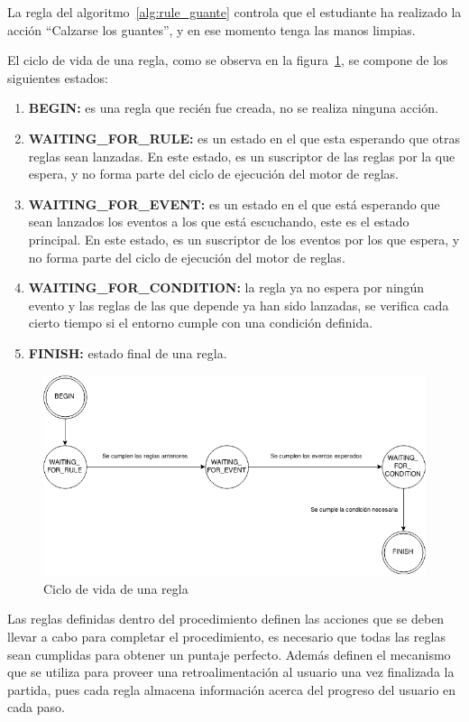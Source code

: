 La regla del algoritmo~\ref{alg:rule_guante} controla que el estudiante ha
realizado la acción \enquote{Calzarse los guantes}, y en ese momento tenga las 
manos limpias.

El ciclo de vida de una regla, como se observa en la figura~\ref{fig:rule_flow},
se compone de los siguientes estados:
\begin{enumerate}
\item \textbf{BEGIN:} es una regla que recién fue creada, no se realiza ninguna
	acción.
\item \textbf{WAITING\_FOR\_RULE:} es un estado en el que esta esperando que otras reglas
	sean lanzadas. En este estado, es un suscriptor de las reglas por la que
	espera, y no forma parte del ciclo de ejecución del motor de reglas.
\item \textbf{WAITING\_FOR\_EVENT:} es un estado en el que está esperando que sean
	lanzados los eventos a los que está escuchando, este es el estado principal. En
	este estado, es un suscriptor de los eventos por los que espera, y no
	forma parte del ciclo de ejecución del motor de reglas.
\item \textbf{WAITING\_FOR\_CONDITION:} la regla ya no espera por ningún evento y las
	reglas de las que depende ya han sido lanzadas, se verifica cada cierto
	tiempo si el entorno cumple con una condición definida. 
\item \textbf{FINISH:} estado final de una regla.
\end{enumerate}

\begin{figure}[H]
\centering
\includegraphics[width=12cm]{solucion/images/rules_flow.png}
\caption{Ciclo de vida de una regla}
\label{fig:rule_flow}
\end{figure}



Las reglas definidas dentro del procedimiento definen las acciones
que se deben llevar a cabo para completar el procedimiento, es necesario que
todas las reglas sean cumplidas para obtener un puntaje perfecto. Además definen el 
mecanismo que se utiliza para proveer una retroalimentación al usuario una vez finalizada 
la partida, pues cada regla almacena información acerca del progreso del usuario en cada paso.

